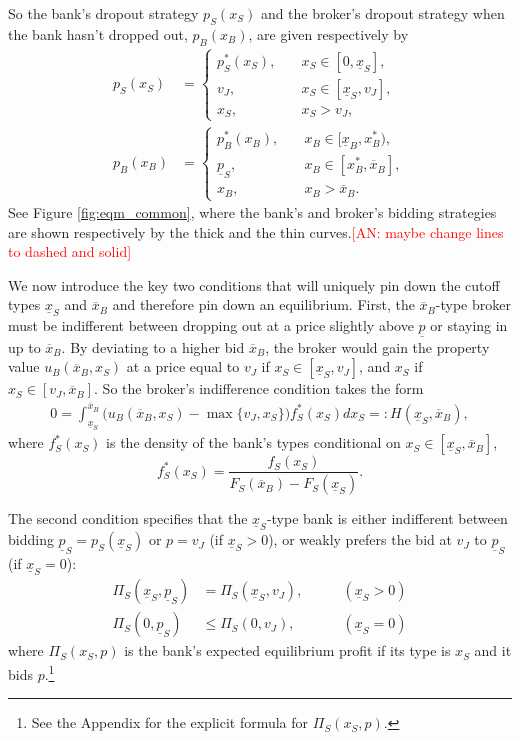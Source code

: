 \documentclass[11pt,twopage]{article}
\newcommand{\AN}[1]{\textcolor{red}{[AN: #1]}}
\newcommand{\ol}{\overline}
\newcommand{\ul}{\underline}
\begin{document}
So the bank's dropout strategy $p_S(x_S)$ and the broker's dropout strategy when the bank hasn't dropped out, $p_B(x_B)$, are given respectively by
\begin{align}
p_S(x_S) & =
\begin{cases}
  p_S^*(x_S), & \quad x_S \in [0, \underline x_S], \\
  v_J,        & \quad x_S\in[\underline x_S,v_J],\\
  x_S ,    & \quad x_S>v_J,
\end{cases} \nonumber \\
p_B(x_B) & =
\begin{cases}
  p_B^*(x_B), & \quad x_B \in [\underline x_B, x_B^*), \\
 \ul p_S,        & \quad x_B\in[x_B^*,\overline x_B] ,\\
  x_B ,    & \quad x_B>\overline x_B.
\end{cases}
\label{eq:strategies}
\end{align}
See Figure \ref{fig:eqm_common}, where the bank's and broker's bidding strategies are shown respectively by the thick and the thin curves.\AN{maybe change lines to dashed and solid}



We now introduce the key two conditions that will uniquely pin down the cutoff types $\underline x_S$ and $\ol x_B$ and therefore pin down an equilibrium.
First, the $\ol x_B$-type broker must be indifferent
between dropping out at a price slightly above $\ul p$ or staying in up to $\ol x_B$. By deviating to a higher bid $\ol x_B$, the broker would gain the property value $u_B(\ol x_B,x_S)$ at a price equal to $v_J$ if $x_S \in [\underline x_S,v_J]$, and $x_S$ if $x_S \in [v_J,\ol x_B]$. So the broker's indifference condition takes the form
\begin{align}
 0 =  \int_{\underline x_S}^{\ol x_B} \Big( u_B(\ol x_B,x_S)-  \max \{ v_J , x_S \}\Big) f_S^*(x_S)d x_S  =: H(\underline x_S,\ol x_B), \label{eq:bindif0}
\end{align} 
where $f_S^*(x_S)$ is the density of the bank's types conditional on  $x_S \in [\ul x_S,\ol x_B]$, 
\[ f_S^*(x_S) = \frac{f_S(x_S)}{F_S(\overline x_B)-F_S(\underline x_S)}.\]




The second condition specifies that the $\underline x_S$-type bank is
either indifferent between bidding $\underline p_S = p_S(\ul x_S)$ or $p=v_J$ (if $\underline x_S > 0$), 
or weakly prefers the bid at $v_J$ to 
$\underline p_S$ (if $\underline x_S = 0$):
\begin{align}
  \Pi_S(\underline x_S,\underline p_S) &= \Pi_S(\underline x_S,v_J),\quad\quad & (\underline x_S > 0)
\label{eq:sindif0}
\\
 \Pi_S(0,\underline p_S) &\leq \Pi_S (0, v_J), \quad\quad  & (\underline x_S = 0) \label{eq:sindif2}
\end{align}
where $\Pi_S(x_S,p)$ is the bank's expected equilibrium profit if its type is $x_S$ and it bids $p$.\footnote{See the Appendix for the explicit formula for  $ \Pi_S(x_S,p)$.}
\end{document}
